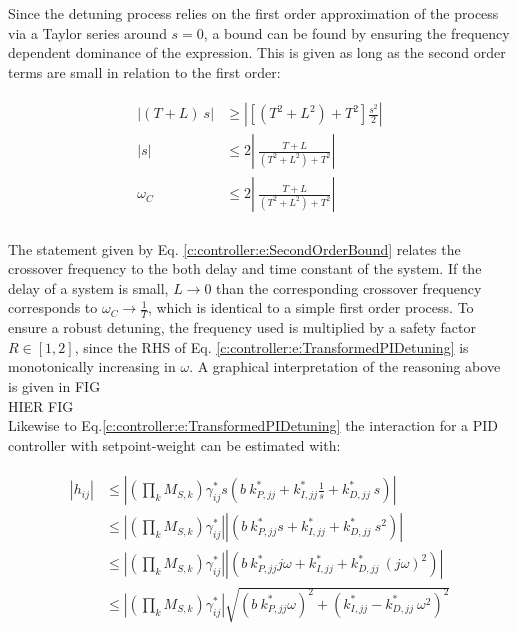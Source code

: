 Since the detuning process relies on the first order approximation of the process via a Taylor series around $s=0$, a bound can be found by ensuring the frequency dependent dominance of the expression. This is given as long as the second order terms are small in relation to the first order:

\begin{align}
\begin{split}
\left|(T+L)~s \right| &\geq \left| \left[(T^2 + L^2) + T^2 \right] \frac{s^2}{2} \right|\\
\left| s \right| & \leq 2 \left| ~\frac{T+L}{(T^2+L^2)+T^2} \right| \\
\omega_C & \leq 2 \left| ~\frac{T+L}{(T^2+L^2)+T^2} \right| \\
\end{split}
\label{c:controller:e:SecondOrderBound}
\end{align}

The statement given by Eq. \ref{c:controller:e:SecondOrderBound} relates the crossover frequency to the both delay and time constant of the system. If the delay of a system is small, $L \to 0$ than the corresponding crossover frequency corresponds to $\omega_C \to \frac{1}{T}$, which is identical to a simple first order process. To ensure a robust detuning, the frequency used is multiplied by a safety factor $R \in \left[1,2\right]$, since the RHS of Eq. \ref{c:controller:e:TransformedPIDetuning} is monotonically increasing in $\omega$. A graphical interpretation of the reasoning above is given in FIG\\

HIER FIG\\

Likewise to Eq.\ref{c:controller:e:TransformedPIDetuning} the interaction for a PID controller with setpoint-weight can be estimated with:

\begin{align}
\begin{split}
\left|h_{ij}\right| &\leq \left| \left(\prod_k M_{S,k} \right) \gamma_{ij}^* s \left(b~k_{P,jj}^* + k_{I,jj}^* \frac{1}{s} + k_{D,jj}^*~s \right) \right| \\
&\leq \left| \left(\prod_k M_{S,k} \right) \gamma_{ij}^*\right| \left|\left(b~k_{P,jj}^* s+ k_{I,jj}^*+ k_{D,jj}^*~s^2  \right) \right| \\
&\leq \left| \left(\prod_k M_{S,k} \right) \gamma_{ij}^*\right| \left|\left(b~k_{P,jj}^* j\omega+ k_{I,jj}^*+ k_{D,jj}^*~(j\omega)^2  \right) \right| \\
&\leq \left| \left(\prod_k M_{S,k} \right) \gamma_{ij}^*\right| \sqrt{\left(b~k_{P,jj}^*\omega\right)^2+ \left(k_{I,jj}^*- k_{D,jj}^*~\omega^2\right)^2} \\
\end{split}
\label{c:controller:e:TransformedPIDDetuning}
\end{align}


